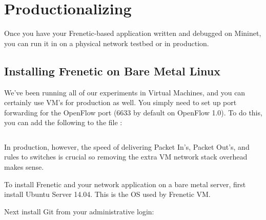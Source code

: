 
\chapter{Productionalizing}

Once you have your Frenetic-based application written and debugged on Mininet, you can run it in on a 
physical network testbed or in production.  

\section{Installing Frenetic on Bare Metal Linux}
 \label{productionalizing:install}
 
We've been running all of our experiments in Virtual Machines, and you can certainly use VM's for
production as well.  You simply need to set up port forwarding for the OpenFlow port (6633 by 
default on OpenFlow 1.0).  To do this, you can add the following to the file :

\inputminted[firstline=29,lastline=30]{ruby}{code/productionalizing/Vagrantfile} 

In production, however, the speed of delivering Packet In's, Packet Out's, and rules to switches is crucial so
removing the extra VM network stack overhead makes sense.

To install Frenetic and your network application on a bare metal server, first install Ubuntu Server 14.04.  
This is the OS used by Frenetic VM.  

Next install Git from your administrative login:

